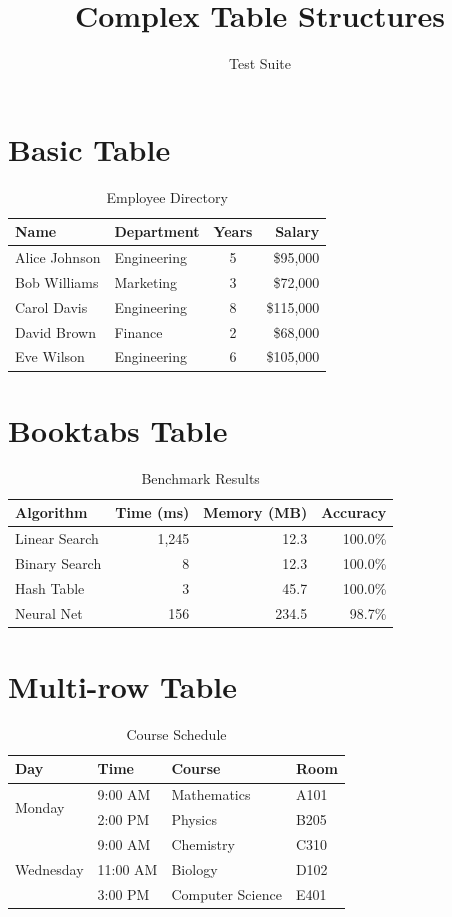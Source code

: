 \documentclass[12pt]{article}
\title{Complex Table Structures}
\author{Test Suite}
\begin{document}
\maketitle

\section{Basic Table}
\begin{table}[h]
\centering
\caption{Employee Directory}
\begin{tabular}{|l|l|c|r|}
\hline
\textbf{Name} & \textbf{Department} & \textbf{Years} & \textbf{Salary} \\
\hline
Alice Johnson & Engineering & 5 & \$95,000 \\
Bob Williams & Marketing & 3 & \$72,000 \\
Carol Davis & Engineering & 8 & \$115,000 \\
David Brown & Finance & 2 & \$68,000 \\
Eve Wilson & Engineering & 6 & \$105,000 \\
\hline
\end{tabular}
\end{table}

\section{Booktabs Table}
\begin{table}[h]
\centering
\caption{Benchmark Results}
\begin{tabular}{lrrr}
\toprule
\textbf{Algorithm} & \textbf{Time (ms)} & \textbf{Memory (MB)} & \textbf{Accuracy} \\
\midrule
Linear Search & 1,245 & 12.3 & 100.0\% \\
Binary Search & 8 & 12.3 & 100.0\% \\
Hash Table & 3 & 45.7 & 100.0\% \\
Neural Net & 156 & 234.5 & 98.7\% \\
\bottomrule
\end{tabular}
\end{table}

\section{Multi-row Table}
\begin{table}[h]
\centering
\caption{Course Schedule}
\begin{tabular}{|l|l|l|l|}
\hline
\textbf{Day} & \textbf{Time} & \textbf{Course} & \textbf{Room} \\
\hline
\multirow{2}{*}{Monday} & 9:00 AM & Mathematics & A101 \\
 & 2:00 PM & Physics & B205 \\
\hline
\multirow{3}{*}{Wednesday} & 9:00 AM & Chemistry & C310 \\
 & 11:00 AM & Biology & D102 \\
 & 3:00 PM & Computer Science & E401 \\
\hline
\end{tabular}
\end{table}
\end{document}
